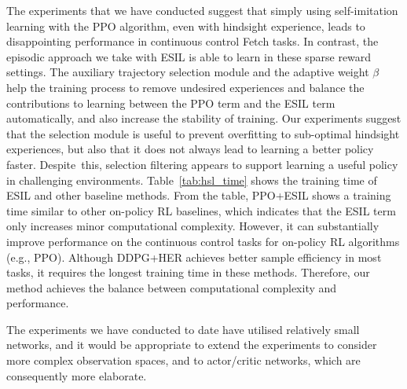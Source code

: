 \begin{table}[h!]
    \centering
    \vspace{0.2em}
    \caption[Training time comparison between ESIL and other baselines.]{Training time (hours:minutes:seconds) of ESIL and baseline approaches on the Reach task for 100 epochs.}
    \label{tab:hsl_time}
\end{table}

The experiments that we have conducted suggest that simply using self-imitation learning with the PPO algorithm, even with hindsight experience, leads to disappointing performance in continuous control Fetch tasks. In contrast, the episodic approach we take with ESIL is able to learn in these sparse reward settings. The auxiliary trajectory selection module and the adaptive weight $\beta$ help the training process to remove undesired experiences and balance the contributions to learning between the PPO term and the ESIL term automatically, and also increase the stability of training. Our experiments suggest that the selection module is useful to prevent overfitting to sub-optimal hindsight experiences, but also that it does not always lead to learning a better policy faster. Despite~this, selection filtering appears to support learning a useful policy in challenging environments. Table~\ref{tab:hsl_time} shows the training time of ESIL and other baseline methods. From the table, PPO+ESIL shows a training time similar to other on-policy RL baselines, which indicates that the ESIL term only increases minor computational complexity. However, it can substantially improve performance on the continuous control tasks for on-policy RL algorithms (e.g., PPO). Although DDPG+HER achieves better sample efficiency in most tasks, it requires the longest training time in these methods. Therefore, our method achieves the balance between computational complexity and performance.

The experiments we have conducted to date have utilised relatively small networks, and it would be appropriate to extend the experiments to consider more complex observation spaces, and to actor/critic networks, which are consequently more elaborate.

